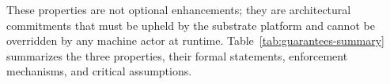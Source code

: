 These properties are not optional enhancements; they are architectural commitments
that must be upheld by the substrate platform and cannot be overridden by any
machine actor at runtime.  Table~\ref{tab:guarantees-summary} summarizes the
three properties, their formal statements, enforcement mechanisms, and critical
assumptions.
